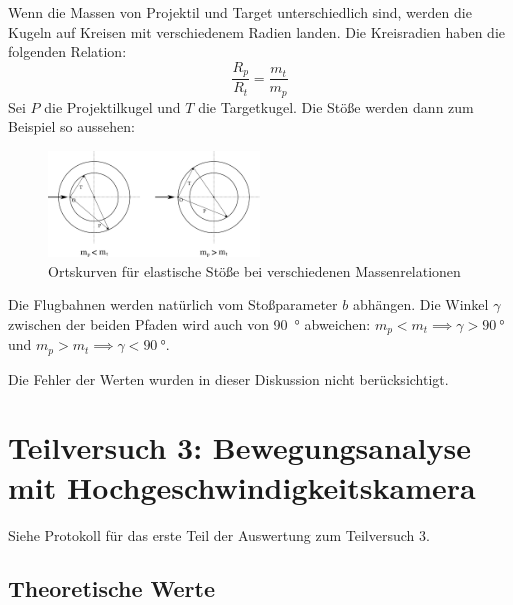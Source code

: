 \documentclass[twoside]{article}
\begin{document}
        Wenn die Massen von Projektil und Target unterschiedlich sind, werden die Kugeln auf Kreisen mit verschiedenem Radien landen. Die Kreisradien haben die folgenden Relation:
        \begin{equation}
            \frac{R_p}{R_t} = \frac{m_t}{m_p}
        \end{equation}
        Sei $P$ die Projektilkugel und $T$ die Targetkugel. Die Stöße werden dann zum Beispiel so aussehen:
        \begin{figure}[H]
            \centering
            \includegraphics[width=0.5\textwidth]{diffmass.eps}
            \caption{Ortskurven für elastische Stöße bei verschiedenen Massenrelationen}
        \end{figure}
        Die Flugbahnen werden natürlich vom Stoßparameter $b$ abhängen. Die Winkel $\gamma$ zwischen der beiden Pfaden wird auch von \SI{90}{\degree} abweichen: $m_p < m_t \implies \gamma > \SI{90}{\degree}$ und $m_p > m_t \implies \gamma < \SI{90}{\degree}$.

        Die Fehler der Werten wurden in dieser Diskussion nicht berücksichtigt.  

\section{Teilversuch 3: Bewegungsanalyse mit Hochgeschwindigkeitskamera}
    Siehe Protokoll für das erste Teil der Auswertung zum Teilversuch 3.

    \subsection{Theoretische Werte}
\end{document}
